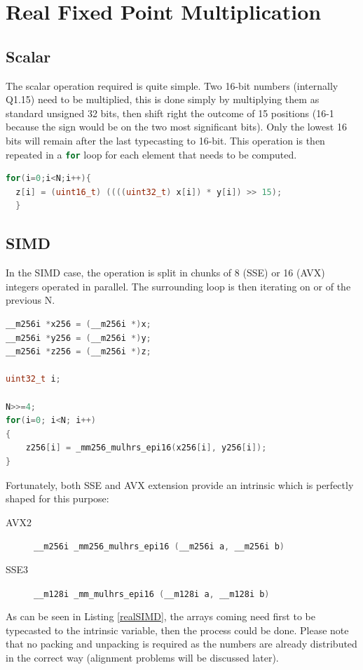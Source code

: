 \documentclass[a4paper]{article}
\begin{document}
\section{Real Fixed Point Multiplication} \label{real}
\subsection{Scalar}
The scalar operation required is quite simple. Two 16-bit numbers (internally Q1.15) need to be multiplied, this is done simply by multiplying them as standard unsigned 32 bits, then shift right the outcome of 15 positions (16-1 because the sign would be on the two most significant bits). Only the lowest 16 bits will remain after the last typecasting to 16-bit.
This operation is then repeated in a \lstinline[language=c, basicstyle=\ttfamily]{for} loop for each element that needs to be computed.

\begin{lstlisting}[language=c,frame=tb,caption=Scalar Real Fixed Point Multiplication]
for(i=0;i<N;i++){
  z[i] = (uint16_t) ((((uint32_t) x[i]) * y[i]) >> 15);
  }
\end{lstlisting}

\subsection{SIMD}
In the SIMD case, the operation is split in chunks of 8 (SSE) or 16 (AVX) integers operated in parallel. The surrounding loop is then iterating on  or  of the previous N.

\begin{lstlisting}[language=c,frame=tb,caption=AVX2 Real Fixed Point Multiplication,label=realSIMD]
__m256i *x256 = (__m256i *)x;
__m256i *y256 = (__m256i *)y;
__m256i *z256 = (__m256i *)z;

uint32_t i;

N>>=4;
for(i=0; i<N; i++)
{   
	z256[i] = _mm256_mulhrs_epi16(x256[i], y256[i]);
}
\end{lstlisting}

Fortunately, both SSE and AVX extension provide an intrinsic which is perfectly shaped for this purpose:
\begin{description}
	\item[AVX2] \lstinline[language=c, basicstyle=\ttfamily]{__m256i _mm256_mulhrs_epi16 (__m256i a, __m256i b)}
	\item[SSE3] \lstinline[language=c, basicstyle=\ttfamily]{__m128i _mm_mulhrs_epi16 (__m128i a, __m128i b)}
\end{description}
As can be seen in Listing \ref{realSIMD}, the arrays coming need first to be typecasted to the intrinsic variable, then the process could be done. Please note that no packing and unpacking is required as the numbers are already distributed in the correct way (alignment problems will be discussed later).
 
\end{document}
